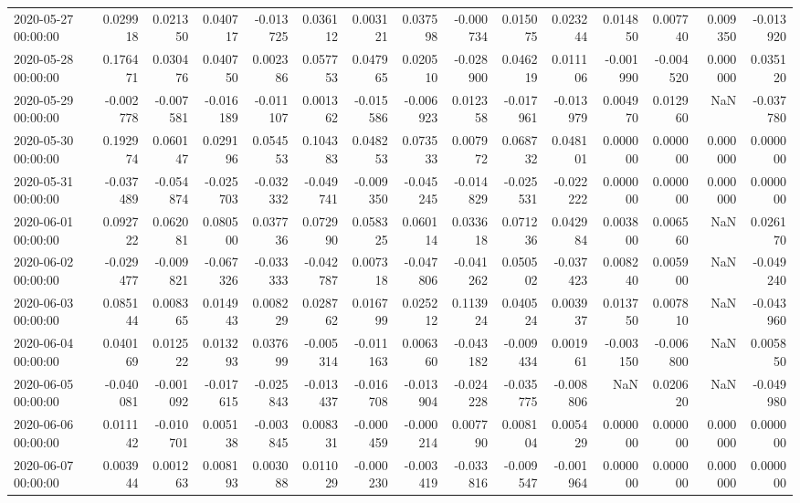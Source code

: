 \begin{tabular}{lrrrrrrrrrrrrrr}
2020-05-27 00:00:00 & 0.029918 & 0.021350 & 0.040717 & -0.013725 & 0.036112 & 0.003121 & 0.037598 & -0.000734 & 0.015075 & 0.023244 & 0.014850 & 0.007740 & 0.009350 & -0.013920 \\
2020-05-28 00:00:00 & 0.176471 & 0.030476 & 0.040750 & 0.002386 & 0.057753 & 0.047965 & 0.020510 & -0.028900 & 0.046219 & 0.011106 & -0.001990 & -0.004520 & 0.000000 & 0.035120 \\
2020-05-29 00:00:00 & -0.002778 & -0.007581 & -0.016189 & -0.011107 & 0.001362 & -0.015586 & -0.006923 & 0.012358 & -0.017961 & -0.013979 & 0.004970 & 0.012960 & NaN & -0.037780 \\
2020-05-30 00:00:00 & 0.192974 & 0.060147 & 0.029196 & 0.054553 & 0.104383 & 0.048253 & 0.073533 & 0.007972 & 0.068732 & 0.048101 & 0.000000 & 0.000000 & 0.000000 & 0.000000 \\
2020-05-31 00:00:00 & -0.037489 & -0.054874 & -0.025703 & -0.032332 & -0.049741 & -0.009350 & -0.045245 & -0.014829 & -0.025531 & -0.022222 & 0.000000 & 0.000000 & 0.000000 & 0.000000 \\
2020-06-01 00:00:00 & 0.092722 & 0.062081 & 0.080500 & 0.037736 & 0.072990 & 0.058325 & 0.060114 & 0.033618 & 0.071236 & 0.042984 & 0.003800 & 0.006560 & NaN & 0.026170 \\
2020-06-02 00:00:00 & -0.029477 & -0.009821 & -0.067326 & -0.033333 & -0.042787 & 0.007318 & -0.047806 & -0.041262 & 0.050502 & -0.037423 & 0.008240 & 0.005900 & NaN & -0.049240 \\
2020-06-03 00:00:00 & 0.085144 & 0.008365 & 0.014943 & 0.008229 & 0.028762 & 0.016799 & 0.025212 & 0.113924 & 0.040524 & 0.003937 & 0.013750 & 0.007810 & NaN & -0.043960 \\
2020-06-04 00:00:00 & 0.040169 & 0.012522 & 0.013293 & 0.037699 & -0.005314 & -0.011163 & 0.006360 & -0.043182 & -0.009434 & 0.001961 & -0.003150 & -0.006800 & NaN & 0.005850 \\
2020-06-05 00:00:00 & -0.040081 & -0.001092 & -0.017615 & -0.025843 & -0.013437 & -0.016708 & -0.013904 & -0.024228 & -0.035775 & -0.008806 & NaN & 0.020620 & NaN & -0.049980 \\
2020-06-06 00:00:00 & 0.011142 & -0.010701 & 0.005138 & -0.003845 & 0.008331 & -0.000459 & -0.000214 & 0.007790 & 0.008104 & 0.005429 & 0.000000 & 0.000000 & 0.000000 & 0.000000 \\
2020-06-07 00:00:00 & 0.003944 & 0.001263 & 0.008193 & 0.003088 & 0.011029 & -0.000230 & -0.003419 & -0.033816 & -0.009547 & -0.001964 & 0.000000 & 0.000000 & 0.000000 & 0.000000 \\

\end{tabular}
